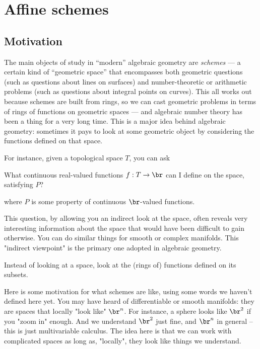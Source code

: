 \chapter{Affine schemes}

\section{Motivation}%
\label{sec:motivation-for-affine-schemes}

The main objects of study in ``modern'' algebraic geometry are \emph{schemes} --- a
certain kind of ``geometric space'' that encompasses both geometric questions
(such as questions about lines on surfaces) and number-theoretic or arithmetic
problems (such as questions about integral points on curves). This all works out
because schemes are built from rings, so we can cast geometric problems in terms
of rings of functions on geometric spaces --- and algebraic number theory has
been a thing for a very long time. This is a major idea behind algebraic
geometry: sometimes it pays to look at some geometric object by considering the
functions defined on that space.

\medskip\noindent For instance, given a topological space $T$, you can ask

\begin{question}
  What continuous real-valued functions $f:T\to\br$ can I define on the space,
  satisfying $P$?
\end{question}
where $P$ is some property of continuous $\br$-valued functions.

\medskip\noindent This question, by allowing you an indirect look at the space,
often reveals very interesting information about the space that would have been
difficult to gain otherwise. You can do similar things for smooth or complex
manifolds. This "indirect viewpoint" is the primary one adopted in algebraic
geometry.

\begin{slogan}
  Instead of looking at a space, look at the (rings of) functions defined on its
  subsets.
\end{slogan}

Here is some motivation for what schemes are like, using some words we haven't
defined here yet. You may have heard of differentiable or smooth manifolds: they
are spaces that locally "look like" $\br^n$. For instance, a sphere looks like
$\br^2$ if you "zoom in" enough. And we understand $\br^2$ just fine, and
$\br^n$ in general -- this is just multivariable calculus. The idea here is that
we can work with complicated spaces as long as, "locally", they look like things
we understand.

